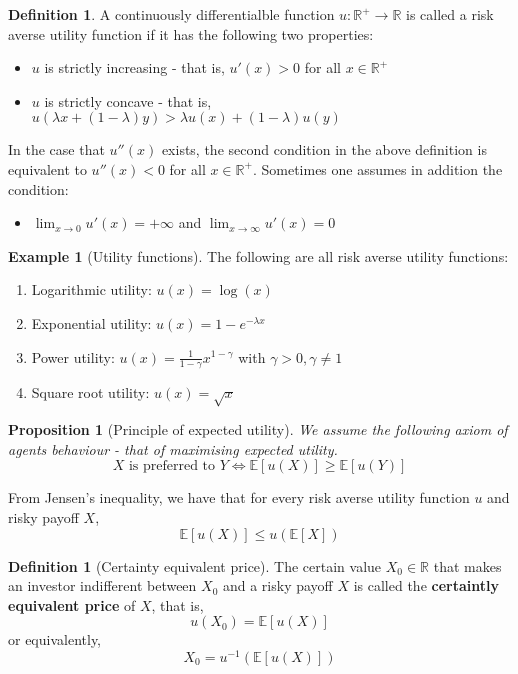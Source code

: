 \documentclass[10pt, oneside, reqno]{amsart}
\theoremstyle{plain}%
\newtheorem{prop}[thm]{Proposition}
\theoremstyle{definition}
\newtheorem{defn}[thm]{Definition}
\newtheorem{exmp}[thm]{Example}
\theoremstyle{remark}
\newcommand{\expc}[1]{\mathbb{E}\left[#1\right]}
\newcommand{\R}{\mathbb{R}}
\begin{document}
\begin{defn}A continuously differentialble function $u: \R^+ \rightarrow \R$ is called a risk averse utility function if it has the following two properties:
    \begin{itemize}
        \item $u$ is strictly increasing - that is, $u'(x) > 0$ for all $x \in \R^+$
        \item $u$ is strictly concave - that is, $u(\lambda x + (1-\lambda)y) > \lambda u(x) + (1-\lambda)u(y)$
    \end{itemize}
        In the case that $u''(x)$ exists, the second condition in the above definition is equivalent to $u''(x) < 0$ for all $x \in \R^+$.  Sometimes one assumes in addition the condition:
        \begin{itemize}
            \item $\lim_{x \rightarrow 0} u'(x) = +\infty$ and $\lim_{x \rightarrow \infty} u'(x) = 0$
        \end{itemize}
\end{defn}


\begin{exmp}[Utility functions]
    The following are all risk averse utility functions:
    \begin{enumerate}
        \item Logarithmic utility: $u(x) = \log(x)$
        \item Exponential utility: $u(x) = 1 - e^{-\lambda x}$
        \item Power utility: $u(x) = \frac{1}{1- \gamma}x^{1-\gamma}$ with $\gamma > 0, \gamma \neq 1$
        \item Square root utility: $u(x) = \sqrt{x}$
    \end{enumerate}
\end{exmp}

\begin{prop}[Principle of expected utility]
    We assume the following axiom of agents behaviour - that of maximising expected utility.\[
        X \text{ is preferred to } Y \iff \expc{u(X)} \geq \expc{u(Y)}
    \]
\end{prop}

From Jensen's inequality, we have that for every risk averse utility function $u$ and risky payoff $X$, \[
    \expc{u(X)} \leq u(\expc{X})
\]

\begin{defn}[Certainty equivalent price]
    The certain value $X_0 \in \R$ that makes an investor indifferent between $X_0$ and a risky payoff $X$ is called the \textbf{certaintly equivalent price} of $X$, that is, \[
        u(X_0) = \expc{u(X)}
    \] or equivalently, \[
        X_0 = u^{-1} \left(\expc{u(X)}\right)
    \]
\end{defn}
\end{document}
